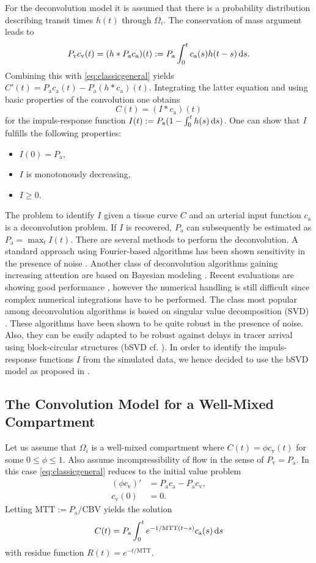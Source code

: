 \documentclass[paper=a4, fontsize=11pt,parskip=half,headings=small]{scrartcl}
\newcommand{\ca}{c_\mathrm{a}}
\newcommand{\CBV}{\mathrm{CBV}}
\newcommand{\MTT}{\mathrm{MTT}}
\newcommand{\cout}{c_{\mathrm{v}}}
\newcommand{\Pa}{P_{\mathrm{a}}}
\newcommand{\Pout}{P_{\mathrm{v}}}
\begin{document}
	For the deconvolution model it is assumed that there is a probability distribution describing transit times $h(t)$ through $\Omega_i$. 
	The conservation of mass argument leads to
	\[
		\Pout\cout(t) = (h*\Pa\ca)(t) := \Pa\int_0^t \ca(s) h(t-s) \diffint s.
	\]
	Combining this with \eqref{eq:classicgeneral} yields $C'(t) = \Pa\ca(t)-\Pa (h*\ca)(t)$.
	Integrating the latter equation and using basic properties of the convolution one obtains
	\begin{equation}
		C(t) = (I*\ca)(t)
		\label{eq:conv}
	\end{equation}
	for the impuls-response function $I(t) := \Pa(1-\int_0^t h(s) \diffint s)$.
	One can show that $I$ fulfills the following properties:
	\begin{itemize}
		\item $I(0) = \Pa$,
		\item $I$ is monotonously decreasing,
		\item $I\ge 0$.		
	\end{itemize}
	The problem to identify $I$ given a tissue curve $C$ and an arterial input function $\ca$ is a deconvolution problem.
	If $I$ is recovered, $\Pa$ can subsequently be estimated as $\Pa = \max_{t} I(t)$.
	There are several methods to perform the deconvolution.
	A standard approach using Fourier-based algorithms has been shown sensitivity in the presence of noise \cite{wirestam00,ostergaard96}.
	Another class of deconvolution algorithms gaining increasing attention are based on Bayesian modeling \cite{boutelier12,mouridsen06}.
	Recent evaluations are showing good performance \cite{sasaki13}, however the numerical handling is still difficult since complex numerical integrations have to be performed.
	The class most popular among deconvolution algorithms is based on singular value decomposition (SVD) \cite{ostergaard96}.
	These algorithms have been shown to be quite robust in the presence of noise.
	Also, they can be easily adapted to be robust against delays in tracer arrival using block-circular structures (bSVD cf. \cite{wu03}).
	In order to identify the impuls-response functions $I$ from the simulated data, we hence decided to use the bSVD model as proposed in \cite{wu03}.

	\subsection{The Convolution Model for a Well-Mixed Compartment} \label{sec:comp}
	Let us assume that $\Omega_i$ is a well-mixed compartment where $C(t) = \phi\cout(t)$ for some $0 \le \phi \le 1$. 
	Also assume incompressibility of flow in the sense of $\Pout=\Pa$.
	In this case \eqref{eq:classicgeneral} reduces to the initial value problem
	\begin{align*}
		(\phi \cout)' &= \Pa \ca - \Pa \cout, \\
		\cout(0)&=0.
	\end{align*}
	Letting $\MTT:=\Pa/\CBV$ yields the solution
	\[
		C(t) = \Pa \int_0^t e^{-1/\MTT(t-s)}\ca(s)\diffint s
	\]
	with residue function $R(t)=e^{-t/\MTT}$. 
\end{document}
